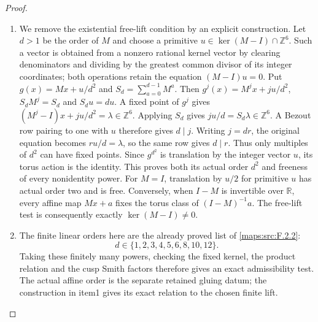 \documentclass[11pt,a4paper]{article}
\theoremstyle{definition}
\begin{document}
\begin{proof}
\begin{enumerate}[label=\arabic*.]
\item We remove the existential free-lift condition by an explicit
construction. Let $d>1$ be the order of $M$ and choose a primitive
$u\in\ker(M-I)\cap\mathbb Z^6$. Such a vector is obtained from a
nonzero rational kernel vector by clearing denominators and dividing
by the greatest common divisor of its integer coordinates; both
operations retain the equation $(M-I)u=0$. Put
$g(x)=Mx+u/d^2$ and $S_d=\sum_{a=0}^{d-1}M^a$.
Then $g^j(x)=M^jx+ju/d^2$, $S_dM^j=S_d$ and $S_du=du$.
A fixed point of $g^j$ gives
$(M^j-I)x+ju/d^2=\lambda\in\mathbb Z^6$.
Applying $S_d$ gives $ju/d=S_d\lambda\in\mathbb Z^6$.
A Bezout row pairing to one with $u$ therefore gives $d\mid j$.
Writing $j=dr$, the original equation becomes $ru/d=\lambda$,
so the same row gives $d\mid r$. Thus only multiples of $d^2$
can have fixed points. Since $g^{d^2}$ is translation by the
integer vector $u$, its torus action is the identity. This proves
both its actual order $d^2$ and freeness of every nonidentity power.
For $M=I$, translation by $u/2$ for primitive $u$ has actual order
two and is free. Conversely, when $I-M$ is invertible over
$\mathbb R$, every affine map $Mx+a$ fixes the torus class of
$(I-M)^{-1}a$. The free-lift test is consequently exactly
$\ker(M-I)\ne0$.

\item The finite linear orders here are the already proved list of
\cref{maps:src:F.2.2}:
\[
 d\in\{1,2,3,4,5,6,8,10,12\}.
 \tag{F.CN1}\label{maps:eq:F.CN1}
\]
Taking these finitely many powers, checking the fixed kernel,
the product relation and the cusp Smith factors therefore gives
an exact admissibility test. The actual affine order is the
separate retained gluing datum; the construction in item1 gives
its exact relation to the chosen finite lift.


\end{enumerate}
\end{proof}
\end{document}
